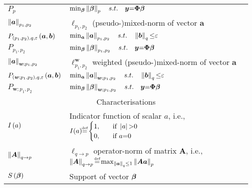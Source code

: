 \begin{table}[hb]
\begin{center}
\begin{tabular}{cc}
\multicolumn{1}{l}{$P_{p}$} & \multicolumn{1}{l}{$\min_{\boldsymbol{\beta}} \left\lVert\boldsymbol{\beta}\right\rVert_p \quad s.t. \quad \boldsymbol{y} {=} \boldsymbol{\Phi} \boldsymbol{\beta}$}   \\
\multicolumn{1}{l}{$\left\lVert\boldsymbol{a}\right\rVert_{p_1,p_2}$} & \multicolumn{1}{l}{$\ell_{p_1,p_2}$ (pseudo-)mixed-norm of vector $\boldsymbol{a}$}   \\
\multicolumn{1}{l}{$P_{\left( p_1,p_2 \right),q,\varepsilon} \left( \boldsymbol{a},\boldsymbol{b} \right)$} & \multicolumn{1}{l}{$\min_{\boldsymbol{a}} \left\lVert\boldsymbol{a}\right\rVert_{p_1,p_2} \quad s.t. \quad \left\lVert\boldsymbol{b}\right\rVert_q {\leq} \varepsilon$}   \\
\multicolumn{1}{l}{$P_{p_1,p_2}$} & \multicolumn{1}{l}{$\min_{\boldsymbol{\beta}} \left\lVert\boldsymbol{\beta}\right\rVert_{p_1,p_2} \quad s.t. \quad \boldsymbol{y} {=} \boldsymbol{\Phi} \boldsymbol{\beta}$}   \\
\multicolumn{1}{l}{$\left\lVert\boldsymbol{a}\right\rVert_{\boldsymbol{w};p_1,p_2}$} & \multicolumn{1}{l}{$\ell_{p_1,p_2}^{\boldsymbol{w}}$ weighted (pseudo-)mixed-norm of vector $\boldsymbol{a}$}   \\
\multicolumn{1}{l}{$P_{\left( \boldsymbol{w};p_1,p_2 \right),q,\varepsilon} \left( \boldsymbol{a},\boldsymbol{b} \right)$} & \multicolumn{1}{l}{$\min_{\boldsymbol{a}} \left\lVert\boldsymbol{a}\right\rVert_{\boldsymbol{w};p_1,p_2} \quad s.t. \quad \left\lVert\boldsymbol{b}\right\rVert_q {\leq} \varepsilon$}   \\
\multicolumn{1}{l}{$P_{\boldsymbol{w};p_1,p_2}$} & \multicolumn{1}{l}{$\min_{\boldsymbol{\beta}} \left\lVert\boldsymbol{\beta}\right\rVert_{\boldsymbol{w};p_1,p_2} \quad s.t. \quad \boldsymbol{y} {=} \boldsymbol{\Phi} \boldsymbol{\beta}$}   \\
\midrule
\multicolumn{2}{c}{Characterisations} \\ 
\midrule
\multicolumn{1}{l}{$I\left( a \right)$} & \multicolumn{1}{l}{Indicator function of scalar $a$, i.e., $
I(a) {\myeq}
  \begin{cases}
    1,  & \quad \text{if } \myabs{a} \sg 0\\
    0,  & \quad \text{if } a \seq 0\\
  \end{cases}
  $
  }
     \\
\multicolumn{1}{l}{$\left\lVert\boldsymbol{A}\right\rVert_{q {\to} p}$} & \multicolumn{1}{l}{$\ell_{q {\to} p}$ operator-norm of matrix $\boldsymbol{A}$, i.e., $\mynorm{\boldsymbol{A}}_{q \to p} {\myeq} 
 \max_{\mynorm{\boldsymbol{a}}_q \leq 1} \mynorm{\boldsymbol{A} \boldsymbol{a}}_{p}$}   \\
\multicolumn{1}{l}{$S\left( \boldsymbol{\beta} \right)$} & \multicolumn{1}{l}{Support of vector $\boldsymbol{\beta}$}   \\

\end{tabular}
\end{center}
\end{table}
